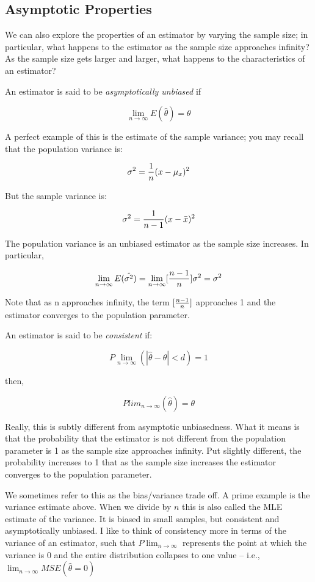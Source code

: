 \documentclass[
]{book}
\begin{document}
\subsection{Asymptotic Properties}\label{asymptotic-properties}

We can also explore the properties of an estimator by varying the sample size; in particular, what happens to the estimator as the sample size approaches infinity? As the sample size gets larger and larger, what happens to the characteristics of an estimator?

An estimator is said to be \emph{asymptotically unbiased} if

\[\lim_{n\to\infty} E(\hat{\theta})=\theta\]

A perfect example of this is the estimate of the sample variance; you may recall that the population variance is:

\[\sigma^2={{1}\over{n}}(x-\mu_{x})^2\]

But the sample variance is:

\[\sigma^2={{1}\over{n-1}}(x-\bar{x})^2\]

The population variance is an unbiased estimator as the sample size increases. In particular,

\[\lim_{n\to\infty} E(\hat{\sigma^2})=\lim_{n\to\infty} [{{n-1}\over{n}}]\sigma^2=\sigma^2\]

Note that as n approaches infinity, the term \([{{n-1}\over{n}}]\) approaches 1 and the estimator converges to the population parameter.

An estimator is said to be \emph{consistent} if:

\[P\lim_{n\to\infty}(|\hat{\theta}-\theta|<d)=1\]

then,

\[Plim_{n\to\infty}(\hat{\theta})=\theta\]

Really, this is subtly different from asymptotic unbiasedness. What it means is that the probability that the estimator is not different from the population parameter is 1 as the sample size approaches infinity. Put slightly different, the probability increases to 1 that as the sample size increases the estimator converges to the population parameter.

We sometimes refer to this as the bias/variance trade off. A prime example is the variance estimate above. When we divide by \(n\) this is also called the MLE estimate of the variance. It is biased in small samples, but consistent and asymptotically unbiased. I like to think of consistency more in terms of the variance of an estimator, such that \(P\lim_{n\to\infty}\) represents the point at which the variance is 0 and the entire distribution collapses to one value -- i.e., \(\lim_{n\to\infty} MSE(\hat{\theta}=0)\)
\end{document}
